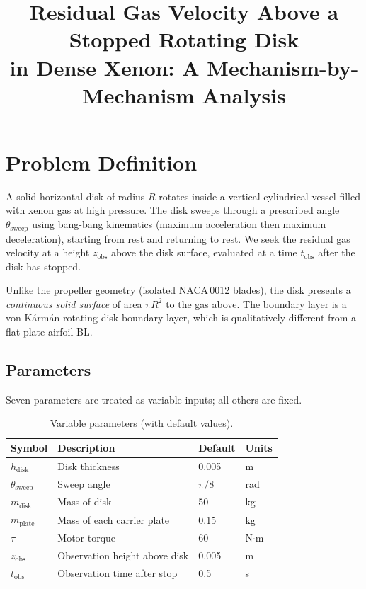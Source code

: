 \documentclass[11pt,a4paper]{article}
\title{Residual Gas Velocity Above a Stopped Rotating Disk\\
       in Dense Xenon: A Mechanism-by-Mechanism Analysis}
\author{}
\date{}
\begin{document}
\maketitle

\section{Problem Definition}
\label{sec:problem}

A solid horizontal disk of radius $R$ rotates inside a vertical
cylindrical vessel filled with xenon gas at high pressure. The disk
sweeps through a prescribed angle $\theta_\mathrm{sweep}$ using
bang-bang kinematics (maximum acceleration then maximum deceleration),
starting from rest and returning to rest. We seek the residual gas
velocity at a height $z_\mathrm{obs}$ above the disk surface, evaluated
at a time $t_\mathrm{obs}$ after the disk has stopped.

Unlike the propeller geometry (isolated NACA\,0012 blades), the disk
presents a \emph{continuous solid surface} of area $\pi R^2$ to the gas
above. The boundary layer is a von K\'arm\'an rotating-disk boundary
layer, which is qualitatively different from a flat-plate airfoil BL.

\subsection{Parameters}

Seven parameters are treated as variable inputs; all others are fixed.

\begin{table}[H]
\centering
\caption{Variable parameters (with default values).}
\label{tab:params}
\begin{tabular}{llll}
\toprule
Symbol & Description & Default & Units \\
\midrule
$h_\mathrm{disk}$        & Disk thickness                  & 0.005 & m   \\
$\theta_\mathrm{sweep}$  & Sweep angle                     & $\pi/8$ & rad \\
$m_\mathrm{disk}$        & Mass of disk                    & 50    & kg  \\
$m_\mathrm{plate}$       & Mass of each carrier plate      & 0.15  & kg  \\
$\tau$                    & Motor torque                    & 60    & N$\cdot$m \\
$z_\mathrm{obs}$         & Observation height above disk   & 0.005 & m \\
$t_\mathrm{obs}$         & Observation time after stop     & 0.5   & s   \\
\bottomrule
\end{tabular}
\end{table}
\end{document}
